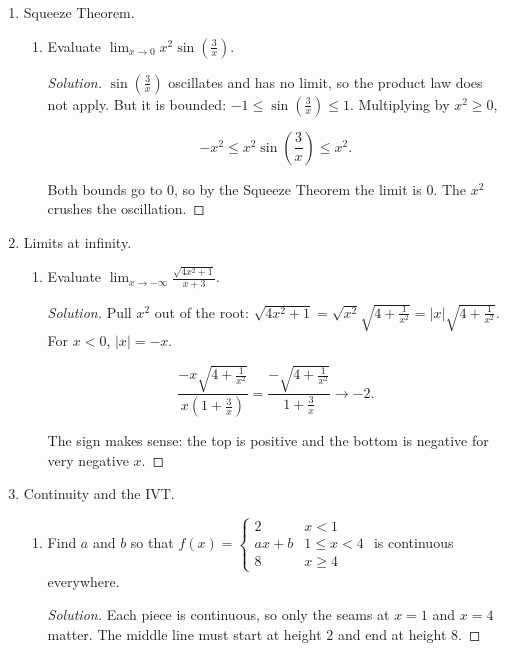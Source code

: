 \documentclass[12pt]{article}
\newcommand\abs[1]{\left| #1 \right|} %
\newcommand\parens[1]{\left( #1 \right)}
\newenvironment{solution}
  {\renewcommand\qedsymbol{$\blacksquare$}\begin{proof}[Solution]}
  {\end{proof}}
\begin{document}
\begin{enumerate}
\begin{enumerate}
\begin{solution}
\[\frac{1}{x+1}\cdot\frac{2-(x+3)}{2(x+3)} = \frac{1}{x+1}\cdot\frac{-(x+1)}{2(x+3)} = \frac{-1}{2(x+3)} \longrightarrow -\frac14.\]
\end{solution}
\end{enumerate}
\item[4.] Squeeze Theorem.
\begin{enumerate}
\item[(a)] Evaluate $\lim_{x \to 0} x^2 \sin\parens{\frac{3}{x}}$.
\begin{solution}
$\sin\parens{\frac{3}{x}}$ oscillates and has no limit, so the product law does not apply. But it is bounded: $-1 \le \sin\parens{\frac3x} \le 1$. Multiplying by $x^2 \ge 0$,

\[-x^2 \le x^2 \sin\parens{\frac{3}{x}} \le x^2.\]

Both bounds go to $0$, so by the Squeeze Theorem the limit is $0$. The $x^2$ crushes the oscillation.
\end{solution}
\end{enumerate}
\item[5.] Limits at infinity.
\begin{enumerate}
\item[(a)] Evaluate $\lim_{x \to -\infty} \frac{\sqrt{4x^2+1}}{x+3}$.
\begin{solution}
Pull $x^2$ out of the root: $\sqrt{4x^2+1} = \sqrt{x^2}\sqrt{4+\frac{1}{x^2}} = \abs{x}\sqrt{4+\frac{1}{x^2}}$. For $x<0$, $\abs{x} = -x$.

\[\frac{-x\sqrt{4+\frac{1}{x^2}}}{x\parens{1+\frac{3}{x}}} = \frac{-\sqrt{4+\frac{1}{x^2}}}{1+\frac{3}{x}} \longrightarrow -2.\]

The sign makes sense: the top is positive and the bottom is negative for very negative $x$.
\end{solution}
\end{enumerate}
\item[6.] Continuity and the IVT.
\begin{enumerate}
\item[(b)] Find $a$ and $b$ so that $f(x) = \begin{cases} 2 & x < 1 \\ ax + b & 1 \leq x < 4 \\ 8 & x \geq 4 \end{cases}$ is continuous everywhere.
\begin{solution}
Each piece is continuous, so only the seams at $x=1$ and $x=4$ matter. The middle line must start at height $2$ and end at height $8$.


\end{solution}
\end{enumerate}
\end{enumerate}
\end{document}
